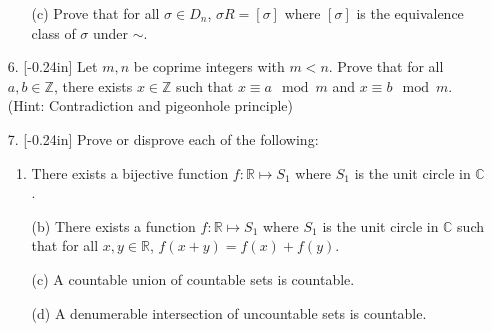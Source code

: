\documentclass[letterpaper,12pt]{article}
\theoremstyle{definition}
\begin{document}
\pagebreak
\begin{enumerate}
    \item[]\begin{enumerate}
        \item[(c)] Prove that for all $\sigma \in D_n$, $\sigma R = [\sigma]$ where $[\sigma]$ is the equivalence class of $\sigma$ under $\sim$.
    \end{enumerate}
\end{enumerate}
\pagebreak
\begin{enumerate}
    \item[6.] \reversemarginpar{}[-0.24in] Let $m,n$ be coprime integers with $m < n$. Prove that for all $a, b \in \mathbb{Z}$, there exists $x \in \mathbb{Z}$ such that $x \equiv a \mod m$ and $x \equiv b \mod m$. (Hint: Contradiction and pigeonhole principle)
\end{enumerate}
\pagebreak
\begin{enumerate}
    \item[7.] \reversemarginpar{}[-0.24in] Prove or disprove each of the following: \begin{enumerate}
        \item There exists a bijective function $f:\mathbb{R} \mapsto S_1$ where $S_1$ is the unit circle in $\mathbb{C}$.
    \end{enumerate}
\end{enumerate}
\pagebreak
\begin{enumerate}
    \item[] \begin{enumerate}
        \item[(b)] There exists a function $f:\mathbb{R} \mapsto S_1$ where $S_1$ is the unit circle in $\mathbb{C}$ such that for all $x,y \in \mathbb{R}$, $f(x+y) = f(x)+f(y)$.
    \end{enumerate}
\end{enumerate}
\pagebreak
\begin{enumerate}
    \item[] \begin{enumerate}
        \item[(c)] A countable union of countable sets is countable.
    \end{enumerate}
\end{enumerate}
\pagebreak
\begin{enumerate}
    \item[] \begin{enumerate}
        \item[(d)] A denumerable intersection of uncountable sets is countable.
    \end{enumerate}
\end{enumerate}
\end{document}
